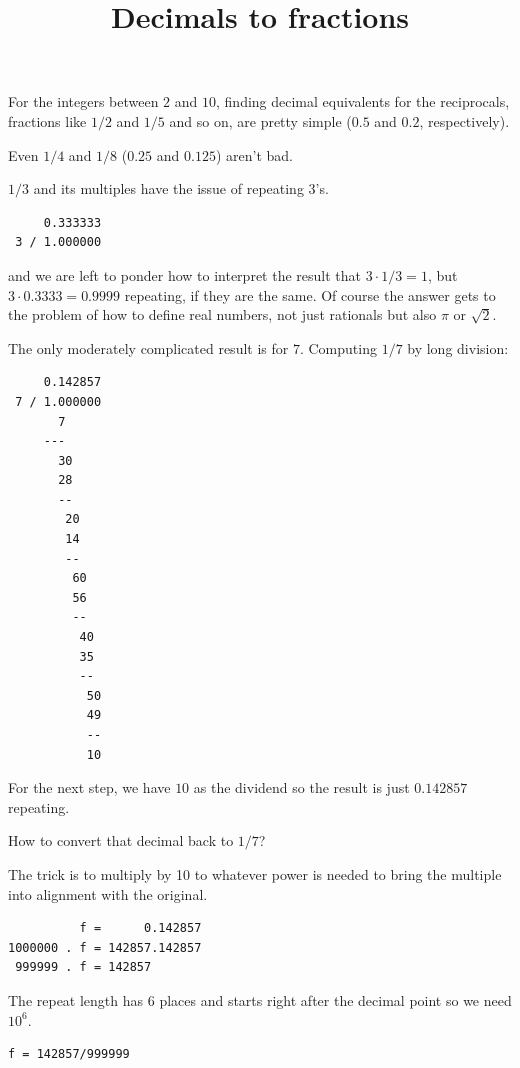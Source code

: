 \documentclass[11pt, oneside]{article}
\title{Decimals to fractions}
\date{}
\begin{document}
\maketitle
\Large


For the integers between $2$ and $10$, finding decimal equivalents for the reciprocals, fractions like $1/2$ and $1/5$ and so on, are pretty simple ($0.5$ and $0.2$, respectively).

Even $1/4$ and $1/8$ ($0.25$ and $0.125$) aren't bad.  

$1/3$ and its multiples have the issue of repeating $3$'s.

\begin{verbatim}
     0.333333
 3 / 1.000000
\end{verbatim}

and we are left to ponder how to interpret the result that $3 \cdot 1/3 = 1$, but $3 \cdot 0.3333 = 0.9999$ repeating, if they are the same.  Of course the answer gets to the problem of how to define real numbers, not just rationals but also $\pi$ or $\sqrt{2}$.

The only moderately complicated result is for $7$.  Computing $1/7$ by long division:

\begin{verbatim}
     0.142857
 7 / 1.000000
       7
     ---
       30
       28
       --
        20
        14
        --
         60
         56
         --
          40
          35
          --
           50
           49
           --
           10
\end{verbatim}

For the next step, we have $10$ as the dividend so the result is just $0.142857$ repeating.

How to convert that decimal back to $1/7$?

The trick is to multiply by 10 to whatever power is needed to bring the multiple into alignment with the original.

\begin{verbatim}
          f =      0.142857
1000000 . f = 142857.142857
 999999 . f = 142857
 \end{verbatim}

 The repeat length has $6$ places and starts right after the decimal point so we need $10^6$.

\begin{verbatim}
f = 142857/999999
\end{verbatim}
\end{document}
